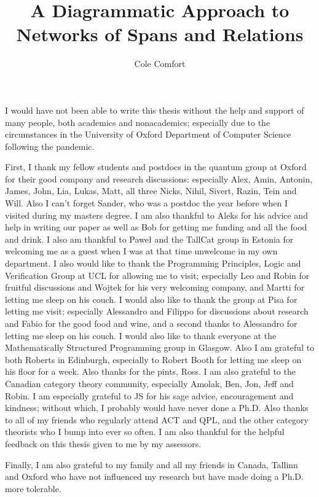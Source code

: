 \documentclass[12pt]{ociamthesis}  %
\title{A Diagrammatic Approach to Networks of Spans and Relations}
\author{Cole Comfort}
\begin{document}
\maketitle



\begin{acknowledgements}

I would have not been able to write this thesis without the help and support of many people, both academics and nonacademics;  especially due to the circumstances in the University of  Oxford Department of Computer Science following the pandemic.

First, I thank my fellow students and postdocs in the quantum group at  Oxford for their good company and research discussions: especially Alex,  Amin, Antonin, James, John, Lia, Lukas, Matt, all three Nicks, Nihil, Sivert, Razin, Tein and Will.  Also I can't forget Sander, who was a postdoc the year before when I visited during my masters degree.
I am also thankful to Aleks for his advice and help in writing our paper as well as Bob for getting me funding and all the  food and drink.
I also am thankful to Pawe\l{} and the TallCat group in Estonia for welcoming me as a guest when I was at that time unwelcome in my own department.  I also would like to thank the Programming Principles, Logic and Verification Group at UCL for allowing me to visit; especially Leo and Robin for fruitful discussions and Wojtek for his very welcoming company, and Martti for letting me sleep on his couch. I would also like to thank the group at Pisa for letting me visit; especially Alessandro and Filippo for discussions about research and Fabio for the good food and wine, and a second thanks to Alessandro for letting me sleep on his couch. I would also like to thank everyone at the Mathematically Structured Programming group in Glasgow.  Also I am grateful to both Roberts in Edinburgh, especially to Robert Booth for letting me sleep on his floor for a week. Also thanks for the pints, Ross.
I am also grateful to the Canadian category theory community, especially Amolak, Ben, Jon, Jeff and Robin.  I am especially grateful to JS for his sage advice, encouragement and kindness; without which, I probably would have never done a Ph.D.  Also thanks to all of my friends who regularly attend ACT and QPL, and the other category theorists who I bump into ever so often.  I am also thankful for the helpful feedback on this thesis given to me by my assessors.

Finally, I am also grateful to my family and all my friends in Canada, Tallinn and Oxford who have not influenced my research but have made doing a Ph.D. more tolerable.
\end{acknowledgements}
\end{document}
